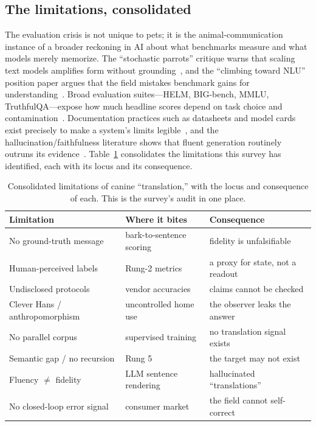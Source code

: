 \subsection{The limitations, consolidated}
The evaluation crisis is not unique to pets; it is the animal-communication
instance of a broader reckoning in AI about what benchmarks measure and what
models merely memorize. The ``stochastic parrots'' critique warns that scaling
text models amplifies form without grounding~\cite{bender2021parrots}, and the
``climbing toward NLU'' position paper argues that the field mistakes
benchmark gains for understanding~\cite{bender2020climbing}. Broad evaluation
suites---HELM, BIG-bench, MMLU, TruthfulQA---expose how much headline scores
depend on task choice and contamination~\cite{liang2023helm,srivastava2023bigbench,hendrycks2021mmlu,lin2022truthfulqa}.
Documentation practices such as datasheets and model cards exist precisely to
make a system's limits legible~\cite{gebru2021datasheets,mitchell2019modelcards},
and the hallucination/faithfulness literature shows that fluent generation
routinely outruns its evidence~\cite{ji2023hallucination,maynez2020faithfulness}.
Table~\ref{tab:limits} consolidates the limitations this survey has identified,
each with its locus and its consequence.

\begin{table}[htbp]
\centering
\caption{Consolidated limitations of canine ``translation,'' with the locus
and consequence of each. This is the survey's audit in one place.}
\label{tab:limits}
\small
\setlength{\tabcolsep}{4pt}
\begin{tabular}{@{}p{4.0cm}p{4.6cm}p{5.0cm}@{}}
\toprule
\textbf{Limitation} & \textbf{Where it bites} & \textbf{Consequence} \\
\midrule
No ground-truth message & bark-to-sentence scoring & fidelity is unfalsifiable \\
Human-perceived labels & Rung-2 metrics & a proxy for state, not a readout \\
Undisclosed protocols & vendor accuracies & claims cannot be checked \\
Clever Hans / anthropomorphism & uncontrolled home use & the observer leaks the answer \\
No parallel corpus & supervised training & no translation signal exists \\
Semantic gap / no recursion & Rung 5 & the target may not exist \\
Fluency $\neq$ fidelity & LLM sentence rendering & hallucinated ``translations'' \\
No closed-loop error signal & consumer market & the field cannot self-correct \\
\bottomrule
\end{tabular}
\end{table}

